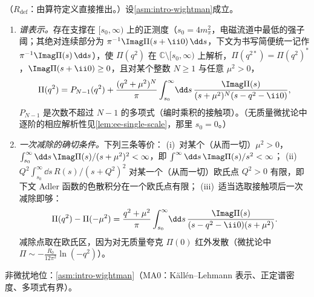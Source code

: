 \begin{proposition}\label{prop:ee-analytic}
（$R_{\mathrm{def}}$：由算符定义直接推出。）设\cref{asm:intro-wightman}成立。
\begin{enumerate}[label=(\alph*),leftmargin=2em,itemsep=1pt,topsep=2pt]
\item \emph{谱表示。}存在支撑在 $[s_0,\infty)$ 上的正测度（$s_0=4m_\pi^2$，电磁流道中最低的强子阈；其绝对连续部分为 $\pi^{-1}\Imag\Pi(s+\ii0)\,\dd s$，下文为书写简便统一记作 $\pi^{-1}\Imag\Pi(s)\,\dd s$），使 $\Pi(q^2)$ 在 $\mathbb C\setminus[s_0,\infty)$ 上解析，$\Pi(q^{2*})=\Pi(q^2)^*$，$\Imag\Pi(s+\ii0)\ge0$，且对某个整数 $N\ge1$ 与任意 $\mu^2>0$，
\begin{equation}\label{eq:ee-KL}
\Pi(q^2)=P_{N-1}(q^2)+\frac{(q^2+\mu^2)^N}{\pi}\int_{s_0}^\infty\!\dd s\,\frac{\Imag\Pi(s)}{(s+\mu^2)^N(s-q^2-\ii0)} ,
\end{equation}
$P_{N-1}$ 是次数不超过 $N-1$ 的多项式（编时乘积的接触项）。（无质量微扰论中逐阶的相应解析性见\cref{lem:ee-single-scale}，那里 $s_0=0$。）
\item \emph{一次减除的确切条件。}下列三条等价：
(i)~对某个（从而一切）$\mu^2>0$，$\int_{s_0}^\infty\dd s\,\Imag\Pi(s)/(s+\mu^2)^2<\infty$，即 $\int^\infty\dd s\,\Imag\Pi(s)/s^2<\infty$；
(ii)~$Q^2\int_{s_0}^\infty\dd s\,R(s)/(s+Q^2)^2$ 对某一个（从而一切）欧氏点 $Q^2>0$ 有限，即下文 Adler 函数的色散积分在一个欧氏点有限；
(iii)~适当选取接触项后一次减除即够：
\begin{equation}\label{eq:ee-once}
\Pi(q^2)-\Pi(-\mu^2)=\frac{q^2+\mu^2}{\pi}\int_{s_0}^\infty\!\dd s\,\frac{\Imag\Pi(s)}{(s-q^2-\ii0)(s+\mu^2)} .
\end{equation}
减除点取在欧氏区，因为对无质量夸克 $\Pi(0)$ 红外发散（微扰论中 $\Pi\sim-\frac{R_0}{12\pi^2}\ln(-q^2)$）。
\end{enumerate}
非微扰地位：\cref{asm:intro-wightman}（MA0：Källén--Lehmann 表示、正定谱密度、多项式有界）。
\end{proposition}
